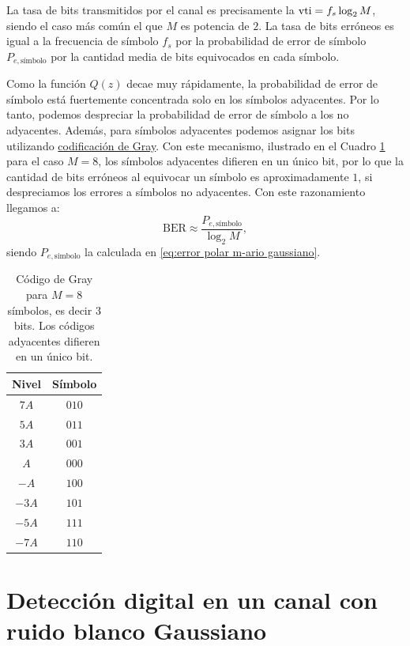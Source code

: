 La tasa de bits transmitidos por el canal es precisamente la $\mathrm{vti}=f_s \log_2 M$, siendo el caso más común el que $M$ es potencia de $2$. La tasa de bits erróneos es igual a la frecuencia de símbolo $f_s$ por la probabilidad de error de símbolo $P_{e,\text{símbolo}}$ por la cantidad media de bits equivocados en cada símbolo.

Como la función $Q(z)$ decae muy rápidamente, la probabilidad de error de símbolo está fuertemente concentrada solo en los símbolos adyacentes. Por lo tanto, podemos despreciar la probabilidad de error de símbolo a los no adyacentes. Además, para símbolos adyacentes podemos asignar los bits utilizando \href{https://en.wikipedia.org/wiki/Gray_code}{codificación de Gray}. Con este mecanismo, ilustrado en el Cuadro \ref{tabla:codigo gray} para el caso $M=8$, los símbolos adyacentes difieren en un único bit, por lo que la cantidad de bits erróneos al equivocar un símbolo es aproximadamente $1$, si despreciamos los errores a símbolos no adyacentes. Con este razonamiento llegamos a:
\begin{equation*}
\mathrm{BER} \approx \frac{P_{e,\text{símbolo}}}{\log_2 M},
\end{equation*}
siendo $P_{e,\text{símbolo}}$ la calculada en \eqref{eq:error polar m-ario gaussiano}.

\begin{table}
    \begin{center}
        \begin{tabular}{|c|c|}
            \hline
            \textbf{Nivel} & \textbf{Símbolo} \\ \hline
            $7A$ & $010$\\
            $5A$ & $011$\\
            $3A$ & $001$\\
            $A$  & $000$\\
            $-A$ & $100$\\
            $-3A$ & $101$\\
            $-5A$ & $111$\\
            $-7A$ & $110$ \\ \hline
        \end{tabular}
    \end{center}
    \caption{Código de Gray para $M=8$ símbolos, es decir $3$ bits. Los códigos adyacentes difieren en un único bit.}\label{tabla:codigo gray}
\end{table}

\section{Detección digital en un canal con ruido blanco Gaussiano}

